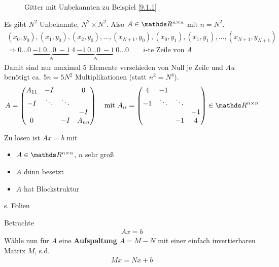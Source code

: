 \begin{Bspe}
\begin{figure}
\begin{image}{Gitter mit Unbekannten zu Beispiel \ref{9.1.1}}
\end{image}\label{im9.1.2}
\end{figure}
Es gibt $N^2$ Unbekannte, $N^2\times N^2$.
Also $A\in\R^{n\times n}$ mit $n=N^2$.
\begin{gather*}
  (x_0,y_0),(x_1,y_0),(x_2,y_0),
  \ldots,(x_{N+1},y_0),(x_0,y_1),(x_1,y_1),
  \ldots,(x_{N+1},y_{N+1})\\
  \Rightarrow 0\ldots0~\underbrace{-1~0\ldots0~-1}_{N}~4~
  \underbrace{-1~0\ldots0~-1}_{N}~0\ldots0
  \qquad \text{$i$-te Zeile von $A$}
\end{gather*}
Damit sind nur maximal 5 Elemente verschieden von Null je Zeile
und $Au$ benötigt ca. $5n=5N^2$ Multiplikationen (statt $n^2=N^4$).
\begin{gather}
  A=
  \begin{pmatrix}
    A_{11}&-I&&0\\
    -I &\ddots &\ddots \\
    && &-I\\
    0&&-I&A_{nn}    
  \end{pmatrix}
  \quad \text{mit }
  A_{ii}=\begin{pmatrix}
    4&-1\\
    -1&\ddots&\ddots\\
    &&&-1\\
    &&-1&4
  \end{pmatrix}\in\R^{n\times n}
\label{IX.1.2}
\end{gather}
\end{Bspe}

Zu lösen ist $Ax=b$ mit
\begin{itemize}
\item $A\in\R^{n\times n}$, $n$ sehr groß
\item $A$ dünn besetzt
\item $A$ hat Blockstruktur
\end{itemize}
s. Folien

Betrachte
\begin{gather}
  Ax=b
\label{IX.2.1}
\end{gather}
Wähle nun für $A$ eine \textbf{Aufspaltung} $A=M-N$
mit einer einfach invertierbaren Matrix $M$, s.d.
\begin{gather}
  Mx = Nx +b \label{IX.2.2}
\end{gather}

